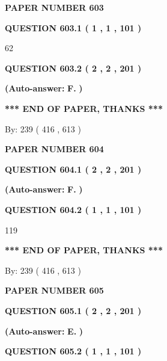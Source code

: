 \documentclass{ctexart}
\begin{document}
   
 {\textbf{ \Large{ PAPER NUMBER  603  }}}
   
   
   
   
  
  
{\textbf{\large{QUESTION
603.1 
 ( 1 , 1 , 101 )
}}}

62
  
  
{\textbf{\large{QUESTION
603.2 
 ( 2 , 2 , 201 )
}}}
 
 
{\textbf{(Auto-answer:}}
{\textbf{\large{
F.}}}
{\textbf{)}}
 
 
   
   
   
   
\vspace{1.0in} 
{\textbf{\large{ *** END OF PAPER, THANKS *** }}} 
   
   
\hspace{1.0in} By: 
 239 ( 416 ,  613 )
   
   
   
   
\newpage 
\setcounter{page}{ 
   604001 } 
   
   
 {\textbf{ \Large{ PAPER NUMBER  604  }}}
   
   
   
   
  
  
{\textbf{\large{QUESTION
604.1 
 ( 2 , 2 , 201 )
}}}
 
 
{\textbf{(Auto-answer:}}
{\textbf{\large{
F.}}}
{\textbf{)}}
 
 
  
  
{\textbf{\large{QUESTION
604.2 
 ( 1 , 1 , 101 )
}}}

119
   
   
   
   
\vspace{1.0in} 
{\textbf{\large{ *** END OF PAPER, THANKS *** }}} 
   
   
\hspace{1.0in} By: 
 239 ( 416 ,  613 )
   
   
   
   
\newpage 
\setcounter{page}{ 
   605001 } 
   
   
 {\textbf{ \Large{ PAPER NUMBER  605  }}}
   
   
   
   
  
  
{\textbf{\large{QUESTION
605.1 
 ( 2 , 2 , 201 )
}}}
 
 
{\textbf{(Auto-answer:}}
{\textbf{\large{
E.}}}
{\textbf{)}}
 
 
  
  
{\textbf{\large{QUESTION
605.2 
 ( 1 , 1 , 101 )
}}}
\end{document}
